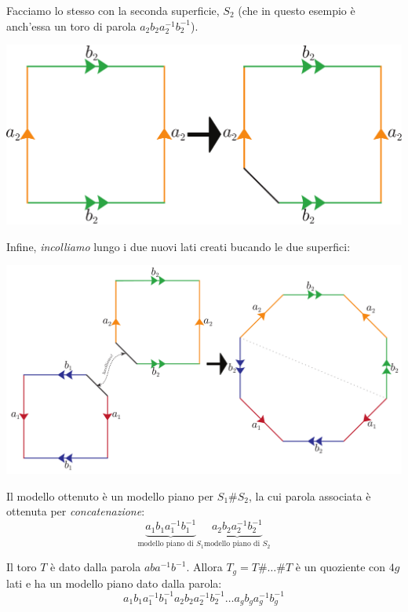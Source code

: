 \vspace{-3mm}
Facciamo lo stesso con la seconda superficie, $S_2$ (che in questo esempio è anch'essa un toro di parola $a_2b_2a_2^{-1}b_2^{-1}$).
\vspace{-3mm}
\begin{center}
	\includegraphics[trim=0cm 0cm 0cm 0cm, clip, scale=0.35]{images/torusmodelconnect3.pdf}
\end{center}
\vspace{-3mm}
Infine, \textit{incolliamo} lungo i due nuovi lati creati bucando le due superfici:
\vspace{-3mm}
 \begin{center}
 	\includegraphics[trim=0cm 0cm 0cm 0cm, clip, scale=0.35]{images/torusmodelconnect4.pdf}
 \end{center}
\vspace{-3mm}
Il modello ottenuto è un modello piano per $S_1\# S_2$, la cui parola associata è ottenuta per \textit{concatenazione}:
\begin{equation*}
	\underbrace{a_1b_1a_1^{-1}b_1^{-1}}_{\text{modello piano di }S_1}\underbrace{a_2b_2a_2^{-1}b_2^{-1}}_{\text{modello piano di }S_2}
\end{equation*}
\vspace{-3mm}
\begin{example}
Il toro $T$ è dato dalla parola $aba^{-1}b^{-1}$. Allora $T_g=T\#\ldots\# T$ è un quoziente con $4g$ lati e ha un modello piano dato dalla parola:
\begin{equation*}
a_1b_1a_1^{-1}b_1^{-1}a_2b_2a_2^{-1}b_2^{-1}\ldots a_gb_ga_g^{-1}b_g^{-1}
\end{equation*}
\vspace{-3mm}
\end{example}
